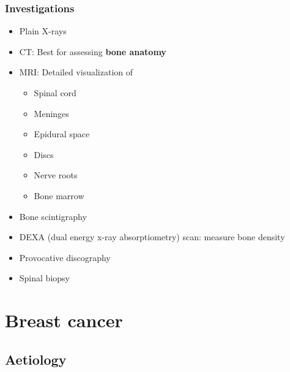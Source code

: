\documentclass[
  14pt,
]{extarticle}
\providecommand{\tightlist}{%
  \setlength{\itemsep}{0pt}\setlength{\parskip}{0pt}}
\begin{document}
\hypertarget{investigations-1}{%
\subsubsection{Investigations}\label{investigations-1}}

\begin{itemize}
\tightlist
\item
  Plain X-rays
\item
  CT: Best for assessing \textbf{bone anatomy}
\item
  MRI: Detailed visualization of

  \begin{itemize}
  \tightlist
  \item
    Spinal cord
  \item
    Meninges
  \item
    Epidural space
  \item
    Discs
  \item
    Nerve roots
  \item
    Bone marrow
  \end{itemize}
\item
  Bone scintigraphy
\item
  DEXA (dual energy x-ray absorptiometry) scan: measure bone density
\item
  Provocative discography
\item
  Spinal biopsy
\end{itemize}

\pagebreak

\hypertarget{breast-cancer}{%
\section{Breast cancer}\label{breast-cancer}}

\hypertarget{aetiology}{%
\subsection{Aetiology}\label{aetiology}}
\end{document}
